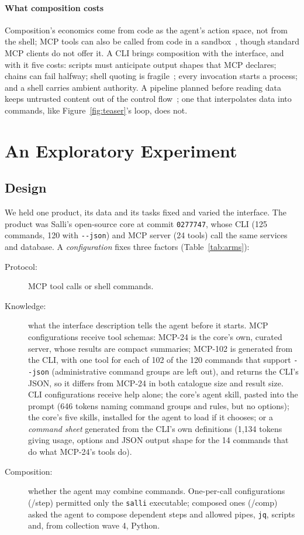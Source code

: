 \documentclass[sigconf,nonacm]{acmart}
\newcommand{\sysA}{Salli}
\newcommand{\flag}[1]{\texttt{-\/-#1}}
\newcommand{\cmd}[1]{\texttt{#1}}
\newcommand{\cfg}[1]{\textsf{#1}}
\begin{document}
\paragraph{What composition costs}
Composition's economics come from code as the agent's action space, not from the shell; MCP tools can also be called from code in a sandbox~\cite{anthropic2025codeexec,anthropic2025advancedtools,cloudflare2025codemode}, though standard MCP clients do not offer it. A CLI brings composition with the interface, and with it five costs: scripts must anticipate output shapes that MCP declares; chains can fail halfway; shell quoting is fragile~\cite{mastykarz2026dont}; every invocation starts a process; and a shell carries ambient authority. A pipeline planned before reading data keeps untrusted content out of the control flow~\cite{debenedetti2025camel}; one that interpolates data into commands, like Figure~\ref{fig:teaser}'s loop, does not.

\section{An Exploratory Experiment}
\label{sec:experiment}

\subsection{Design}
We held one product, its data and its tasks fixed and varied the interface. The product was \sysA{}'s open-source core at commit \texttt{0277747}, whose CLI (125 commands, 120 with \flag{json}) and MCP server (24 tools) call the same services and database. A \emph{configuration} fixes three factors (Table~\ref{tab:arms}):
\begin{description}
\item[Protocol:] MCP tool calls or shell commands.
\item[Knowledge:] what the interface description tells the agent before it starts. MCP configurations receive tool schemas: \cfg{MCP-24} is the core's own, curated server, whose results are compact summaries; \cfg{MCP-102} is generated from the CLI, with one tool for each of 102 of the 120 commands that support \flag{json} (administrative command groups are left out), and returns the CLI's JSON, so it differs from \cfg{MCP-24} in both catalogue size and result size. CLI configurations receive help alone; the core's agent skill, pasted into the prompt (646 tokens naming command groups and rules, but no options); the core's five skills, installed for the agent to load if it chooses; or a \emph{command sheet} generated from the CLI's own definitions (1{,}134 tokens giving usage, options and JSON output shape for the 14 commands that do what \cfg{MCP-24}'s tools do).
\item[Composition:] whether the agent may combine commands. One-per-call configurations (\cfg{/step}) permitted only the \cmd{salli} executable; composed ones (\cfg{/comp}) asked the agent to compose dependent steps and allowed pipes, \cmd{jq}, scripts and, from collection wave 4, Python.
\end{description}
\end{document}

